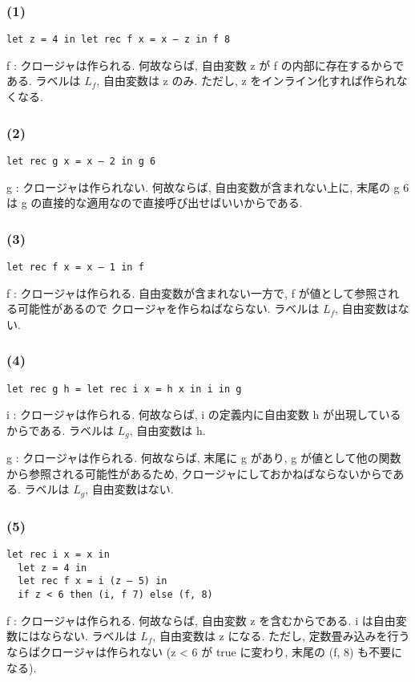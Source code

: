\documentclass[dvipdfmx]{jsarticle}
\begin{document}
\subsubsection*{(1)}
  \begin{lstlisting}[]
  let z = 4 in let rec f x = x – z in f 8
  \end{lstlisting}
  f :
  クロージャは作られる. 何故ならば, 自由変数 z が f の内部に存在するからである.
  ラベルは $L_f$, 自由変数は z のみ.
  ただし, z をインライン化すれば作られなくなる.

  \subsubsection*{(2)}
  \begin{lstlisting}[]
  let rec g x = x – 2 in g 6
  \end{lstlisting}
  g :
  クロージャは作られない. 何故ならば, 自由変数が含まれない上に, 末尾の g 6 は
  g の直接的な適用なので直接呼び出せばいいからである.

  \subsubsection*{(3)}
  \begin{lstlisting}[]
  let rec f x = x – 1 in f
  \end{lstlisting}
  f :
  クロージャは作られる. 自由変数が含まれない一方で, f が値として参照される可能性があるので
  クロージャを作らねばならない. ラベルは $L_f$, 自由変数はない.

  \subsubsection*{(4)}
  \begin{lstlisting}[]
  let rec g h = let rec i x = h x in i in g
  \end{lstlisting}
  i :
  クロージャは作られる. 何故ならば, i の定義内に自由変数 h が出現しているからである.
  ラベルは $L_g$, 自由変数は h.

  g :
  クロージャは作られる. 何故ならば, 末尾に g があり, g が値として他の関数から参照される可能性があるため,
  クロージャにしておかねばならないからである. ラベルは $L_g$, 自由変数はない.

  \subsubsection*{(5)}
  \begin{lstlisting}[]
  let rec i x = x in
  let z = 4 in
  let rec f x = i (z – 5) in
  if z < 6 then (i, f 7) else (f, 8)
  \end{lstlisting}
  f :
  クロージャは作られる. 何故ならば, 自由変数 z を含むからである. i は自由変数にはならない.
  ラベルは $L_f$, 自由変数は z になる.
  ただし, 定数畳み込みを行うならばクロージャは作られない (z < 6 が true に変わり, 末尾の (f, 8) も不要になる).
\end{document}
